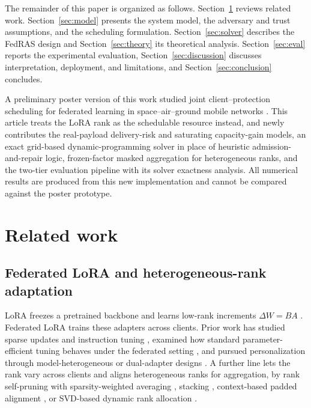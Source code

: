 \documentclass[a4paper,fleqn]{cas-dc}
\begin{document}
The remainder of this paper is organized as follows. Section~\ref{sec:related} reviews related work. Section~\ref{sec:model} presents the system model, the adversary and trust assumptions, and the scheduling formulation. Section~\ref{sec:solver} describes the FedRAS design and Section~\ref{sec:theory} its theoretical analysis. Section~\ref{sec:eval} reports the experimental evaluation, Section~\ref{sec:discussion} discusses interpretation, deployment, and limitations, and Section~\ref{sec:conclusion} concludes.

A preliminary poster version of this work studied joint client--protection scheduling for federated learning in space--air--ground mobile networks \cite{ma2026mswim}. This article treats the LoRA rank as the schedulable resource instead, and newly contributes the real-payload delivery-risk and saturating capacity-gain models, an exact grid-based dynamic-programming solver in place of heuristic admission-and-repair logic, frozen-factor masked aggregation for heterogeneous ranks, and the two-tier evaluation pipeline with its solver exactness analysis. All numerical results are produced from this new implementation and cannot be compared against the poster prototype.

\section{Related work}
\label{sec:related}

\subsection{Federated LoRA and heterogeneous-rank adaptation}
\label{sec:rwlora}
LoRA freezes a pretrained backbone and learns low-rank increments $\Delta W=BA$ \cite{hu2022lora}. Federated LoRA trains these adapters across clients. Prior work has studied sparse updates and instruction tuning \cite{babakniya2023slora,zhang2024fedit}, examined how standard parameter-efficient tuning behaves under the federated setting \cite{zhang2023fedpetuning}, and pursued personalization through model-heterogeneous or dual-adapter designs \cite{yi2026pfedlora,yang2024feddpa}. A further line lets the rank vary across clients and aligns heterogeneous ranks for aggregation, by rank self-pruning with sparsity-weighted averaging \cite{cho2024hetlora}, stacking \cite{wang2024flora}, context-based padded alignment \cite{fan2025helora}, or SVD-based dynamic rank allocation \cite{wu2026fedara}.
\end{document}
